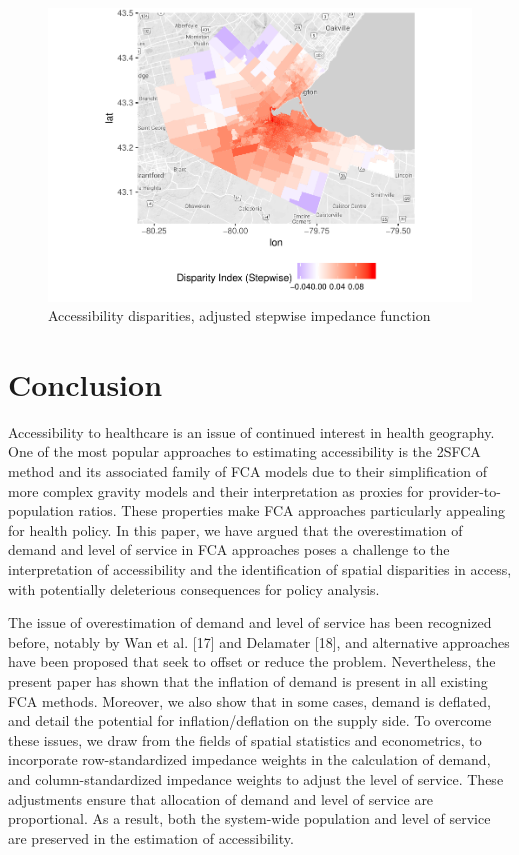 \documentclass[10pt,letterpaper]{article}
\begin{document}
\begin{figure}
\includegraphics[width=0.95\linewidth]{Supply_and_Demand_Inflation_in_FCA_Methods_v2.0_files/figure-latex/fig20-map-disparities-stepwise-1} \caption{\label{fig:fig20-map-disparities-stepwise}Accessibility disparities, adjusted stepwise impedance function}\label{fig:fig20-map-disparities-stepwise}
\end{figure}

\section{Conclusion}\label{conclusion}

Accessibility to healthcare is an issue of continued interest in health
geography. One of the most popular approaches to estimating
accessibility is the 2SFCA method and its associated family of FCA
models due to their simplification of more complex gravity models and
their interpretation as proxies for provider-to-population ratios. These
properties make FCA approaches particularly appealing for health policy.
In this paper, we have argued that the overestimation of demand and
level of service in FCA approaches poses a challenge to the
interpretation of accessibility and the identification of spatial
disparities in access, with potentially deleterious consequences for
policy analysis.

The issue of overestimation of demand and level of service has been
recognized before, notably by Wan et al. {[}17{]} and Delamater
{[}18{]}, and alternative approaches have been proposed that seek to
offset or reduce the problem. Nevertheless, the present paper has shown
that the inflation of demand is present in all existing FCA methods.
Moreover, we also show that in some cases, demand is deflated, and
detail the potential for inflation/deflation on the supply side. To
overcome these issues, we draw from the fields of spatial statistics and
econometrics, to incorporate row-standardized impedance weights in the
calculation of demand, and column-standardized impedance weights to
adjust the level of service. These adjustments ensure that allocation of
demand and level of service are proportional. As a result, both the
system-wide population and level of service are preserved in the
estimation of accessibility.
\end{document}
